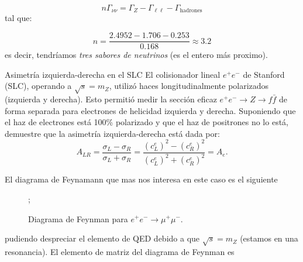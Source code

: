 \begin{equation}
	n 	\Gamma_{{\nu \nu}} = \Gamma_Z -\Gamma_{\ell \ell}  - \Gamma_{\text{hadrones}} 
\end{equation}
tal que: 

\begin{equation}
	n = \frac{2.4952-1.706-0.253}{0.168} \approx 3.2 
\end{equation}
es decir, tendríamos \textit{tres sabores de neutrinos} (es el entero más proximo). 


\begin{Ejercicio}{Asimetría izquierda-derecha en el SLC}\label{Ej:20}
El colisionador lineal $e^+e^-$ de Stanford (SLC), operando a $\sqrt{s} = m_Z$, utilizó haces longitudinalmente polarizados (izquierda y derecha). 
Esto permitió medir la sección eficaz $e^+e^- \to Z \to f\bar{f}$ de forma separada para electrones de helicidad izquierda y derecha.
Suponiendo que el haz de electrones está 100\% polarizado y que el haz de positrones no lo está, demuestre que la asimetría izquierda-derecha está dada por:
\[
A_{LR} = \frac{\sigma_L - \sigma_R}{\sigma_L + \sigma_R} 
= \frac{(c_L^e)^2 - (c_R^e)^2}{(c_L^e)^2 + (c_R^e)^2} = A_e.
\]
\end{Ejercicio}

El diagrama de Feynamann que mas nos interesa en este caso es el siguiente
\begin{figure}[h]
	\centering
	;
	\caption{Diagrama de Feynman para \(e^+ e^- \to \mu^+ \mu^-\).}
\end{figure}
pudiendo despreciar el elemento de QED debido a que $\sqrt{s}=m_Z$ (estamos en una resonancia). El elemento de matriz del diagrama de Feynman es \cite{thomson_modern_physics}

